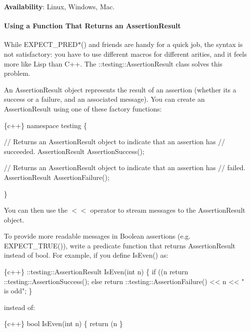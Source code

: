 {\bfseries Availability}\+: Linux, Windows, Mac.

\paragraph*{Using a Function That Returns an Assertion\+Result}

While {\ttfamily E\+X\+P\+E\+C\+T\+\_\+\+P\+R\+E\+D$\ast$()} and friends are handy for a quick job, the syntax is not satisfactory\+: you have to use different macros for different arities, and it feels more like Lisp than C++. The {\ttfamily \+::testing\+::\+Assertion\+Result} class solves this problem.

An {\ttfamily Assertion\+Result} object represents the result of an assertion (whether it\textquotesingle{}s a success or a failure, and an associated message). You can create an {\ttfamily Assertion\+Result} using one of these factory functions\+:


\begin{DoxyCode}
\{c++\}
namespace testing \{

// Returns an AssertionResult object to indicate that an assertion has
// succeeded.
AssertionResult AssertionSuccess();

// Returns an AssertionResult object to indicate that an assertion has
// failed.
AssertionResult AssertionFailure();

\}
\end{DoxyCode}


You can then use the {\ttfamily $<$$<$} operator to stream messages to the {\ttfamily Assertion\+Result} object.

To provide more readable messages in Boolean assertions (e.\+g. {\ttfamily E\+X\+P\+E\+C\+T\+\_\+\+T\+R\+U\+E()}), write a predicate function that returns {\ttfamily Assertion\+Result} instead of {\ttfamily bool}. For example, if you define {\ttfamily Is\+Even()} as\+:


\begin{DoxyCode}
\{c++\}
::testing::AssertionResult IsEven(int n) \{
  if ((n %
     return ::testing::AssertionSuccess();
  else
     return ::testing::AssertionFailure() << n << " is odd";
\}
\end{DoxyCode}


instead of\+:


\begin{DoxyCode}
\{c++\}
bool IsEven(int n) \{
  return (n %
\}
\end{DoxyCode}


